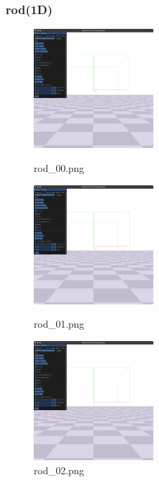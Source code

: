 \documentclass[a4paper,10pt,uplatex,dvipdfmx]{jsarticle}
\begin{document}
\subsubsection{rod(1D)}
\begin{figure}[htbp]
  \begin{minipage}{0.33\hsize}
    \begin{center}
      \includegraphics[width=45mm]{img/rod_00.png}
      \caption{rod\_00.png}
    \end{center}
  \end{minipage}
  \begin{minipage}{0.33\hsize}
    \begin{center}
      \includegraphics[width=45mm]{img/rod_01.png}
      \caption{rod\_01.png}
    \end{center}
  \end{minipage}
  \begin{minipage}{0.33\hsize}
    \begin{center}
      \includegraphics[width=45mm]{img/rod_02.png}
      \caption{rod\_02.png}
    \end{center}
  \end{minipage}
\end{figure}
\end{document}
